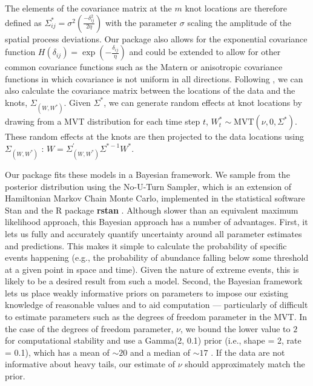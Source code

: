 \documentclass[12pt,english]{article}
\begin{document}
\begin{spacing}{1.25}
The elements of the covariance matrix at the $m$ knot locations are therefore
defined as $\Sigma_{ij}^*=\sigma^2 \left( \frac{-\delta_{ij}^2}{2 \eta}  \right)$ with the
parameter $\sigma$ scaling the amplitude of the spatial process deviations. Our
package also allows for the exponential covariance function $H(\delta_{ij}) =
\exp \left(-\frac{\delta_{ij} }{\eta} \right)$ and could be extended to allow for other
common covariance functions such as the Matern or anisotropic covariance
functions in which covariance is not uniform in all directions.
Following \citet{latimer2009}, we can also calculate the covariance matrix
between the locations of the data and the knots,
$\Sigma_{\left(W, W^* \right)}$.
Given $\Sigma^*$, we can generate random effects at knot
locations by drawing from a MVT distribution for each time step $t$,
$W_t^*\sim \mathrm{MVT}\left( \nu, 0, \Sigma^{*} \right)$.
These random effects at the knots are then projected to the data locations using
$\Sigma_{\left( W,W^{*} \right)}$ \citep{latimer2009}:
$W=\Sigma_{\left(W,W^* \right)}^{'} \Sigma^{*-1}W^*$.

Our package fits these models in a Bayesian framework. We sample
from the posterior distribution using the No-U-Turn Sampler, which is an
extension of Hamiltonian Markov Chain Monte Carlo, implemented in the
statistical software Stan \citep{standevelopmentteam2016a, carpenter2017}
and the R package \textbf{rstan} \citep{standevelopmentteam2016}. Although slower
than an equivalent maximum likelihood approach, this Bayesian approach has a
number of advantages. First, it lets us fully and accurately quantify
uncertainty around all parameter estimates and predictions. This makes it
simple to calculate the probability of specific events happening (e.g., the
probability of abundance falling below some threshold at a given point in space
and time). Given the nature of extreme events, this is likely to be a desired
result from such a model. Second, the Bayesian framework lets us place weakly
informative priors on parameters to impose our existing knowledge of reasonable
values and to aid computation --- particularly of difficult to estimate
parameters such as the degrees of freedom parameter in the MVT. In the case of
the degrees of freedom parameter, $\nu$, we bound the lower value to $2$ for
computational stability and use a Gamma(2, 0.1) prior (i.e., shape = 2, rate = 0.1),
which has a mean of $\sim 20$ and a median of $\sim 17$ \citep{juarez2010}.
If the data are not informative about heavy
tails, our estimate of $\nu$ should approximately match the prior.


\end{spacing}
\end{document}
